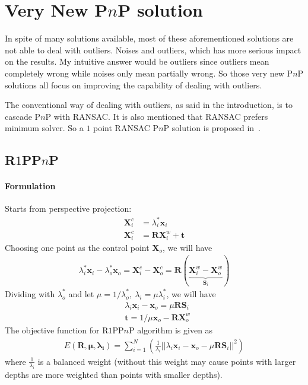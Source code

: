 \documentclass[a4paper]{article}
\begin{document}
\section{Very New P$n$P solution}
In spite of many solutions available, most of these aforementioned solutions are not able to deal with outliers. Noises and outliers, which has more serious impact on the results. My intuitive answer would be outliers since outliers mean completely wrong while noises only mean partially wrong. So those very new P$n$P solutions all focus on improving the capability of dealing with outliers. 

The conventional way of dealing with outliers, as said in the introduction, is to cascade P$n$P with RANSAC. It is also mentioned that RANSAC prefers minimum solver. So a $1$ point RANSAC P$n$P  solution is proposed in~\cite{8470970}.

\subsection{R$1$PP$n$P}
\paragraph{Formulation}
Starts from perspective projection:
\begin{align*}
	\mathbf{X}_i^{c}&=\lambda_i^* \mathbf{x}_i \\
	\mathbf{X}_i^{c}&= \mathbf{R}\mathbf{X}_i^{w}+\mathbf{t}
\end{align*}
Choosing one point as the control point $\mathbf{X}_o$, we will have
\begin{align*}
\lambda_i^* \mathbf{x}_i - \lambda_o^* \mathbf{x}_o = 
\mathbf{X}_i^{c}-\mathbf{X}_o^{c}= \mathbf{R}(\underbrace{\mathbf{X}_i^{w}-\mathbf{X}_o^{w}}_{\mathbf{S}_i})
\end{align*}
Dividing with $\lambda_o^*$ and let $\mu=1/\lambda_o^*,\ \lambda_i=\mu\lambda_i^*$, we will have
\begin{align*}
&\lambda_i \mathbf{x}_i - \mathbf{x}_o=\mu \mathbf{RS}_i \\
&\mathbf{t}=1/\mu \mathbf{x}_o-\mathbf{RX}_o^{w}
\end{align*}
The objective function for R$1$PP$n$P algorithm is given as
\begin{align*}
E(\mathbf{R,\mu,\lambda_i})=\sum_{i=1}^{N}\left(
\frac{1}{\lambda_i}||\lambda_i \mathbf{x}_i - \mathbf{x}_o-\mu \mathbf{RS}_i ||^2
\right)
\end{align*}
where $\frac{1}{\lambda_i}$ is a balanced weight (without this weight may cause points with larger depths are more weighted than points with smaller depths). 
\end{document}
